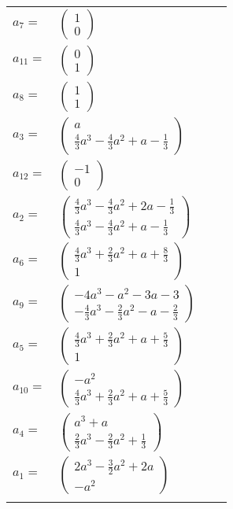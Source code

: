 \documentclass[1p]{elsarticle_modified}
\theoremstyle{definition}
\begin{document}
\begin{tabular}{m{7pt} m{180pt} m{7pt} m{180pt} }
\flushright $a_{7}=$&$\begin{pmatrix}1\\0\end{pmatrix}$ \\
\flushright $a_{11}=$&$\begin{pmatrix}0\\1\end{pmatrix}$ \\
\flushright $a_{8}=$&$\begin{pmatrix}1\\1\end{pmatrix}$ \\
\flushright $a_{3}=$&$\begin{pmatrix}a\\\frac{4}{3} a^3-\frac{4}{3} a^2+a-\frac{1}{3}\end{pmatrix}$ \\
\flushright $a_{12}=$&$\begin{pmatrix}-1\\0\end{pmatrix}$ \\
\flushright $a_{2}=$&$\begin{pmatrix}\frac{4}{3} a^3-\frac{4}{3} a^2+2 a-\frac{1}{3}\\\frac{4}{3} a^3-\frac{4}{3} a^2+a-\frac{1}{3}\end{pmatrix}$ \\
\flushright $a_{6}=$&$\begin{pmatrix}\frac{4}{3} a^3+\frac{2}{3} a^2+a+\frac{8}{3}\\1\end{pmatrix}$ \\
\flushright $a_{9}=$&$\begin{pmatrix}-4 a^3- a^2-3 a-3\\-\frac{4}{3} a^3-\frac{2}{3} a^2- a-\frac{2}{3}\end{pmatrix}$ \\
\flushright $a_{5}=$&$\begin{pmatrix}\frac{4}{3} a^3+\frac{2}{3} a^2+a+\frac{5}{3}\\1\end{pmatrix}$ \\
\flushright $a_{10}=$&$\begin{pmatrix}- a^2\\\frac{4}{3} a^3+\frac{2}{3} a^2+a+\frac{5}{3}\end{pmatrix}$ \\
\flushright $a_{4}=$&$\begin{pmatrix}a^3+a\\\frac{2}{3} a^3-\frac{2}{3} a^2+\frac{1}{3}\end{pmatrix}$ \\
\flushright $a_{1}=$&$\begin{pmatrix}2 a^3-\frac{3}{2} a^2+2 a\\- a^2\end{pmatrix}$\\&\end{tabular}
\end{document}
